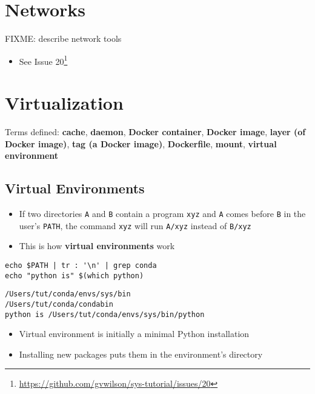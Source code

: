 \documentclass[krantzl]{krantz}
\newcommand{\glossref}[1]{\textbf{#1}}
\newcommand{\hreffoot}[2]{{#1}\footnote{\href{#2}{#2}}}
\begin{document}
\chapter{Networks}\label{network}




FIXME: describe network tools

\begin{itemize}
\item See \hreffoot{Issue 20}{https://github.com/gvwilson/sys-tutorial/issues/20}

\end{itemize}
\chapter{Virtualization}\label{virt}




Terms defined: 
\glossref{cache}, \glossref{daemon}, \glossref{Docker container}, \glossref{Docker image}, \glossref{layer (of Docker image)}, \glossref{tag (a Docker image)}, \glossref{Dockerfile}, \glossref{mount}, \glossref{virtual environment}


\section{Virtual Environments}
\begin{itemize}
\item If two directories \texttt{A} and \texttt{B} contain a program \texttt{xyz}
    and \texttt{A} comes before \texttt{B} in the user’s \texttt{PATH},
    the command \texttt{xyz} will run \texttt{A/xyz} instead of \texttt{B/xyz}

\item This is how \glossref{virtual environments} work

\end{itemize}
\begin{lstlisting}[frame=tblr]
echo $PATH | tr : '\n' | grep conda
echo "python is" $(which python)
\end{lstlisting}

\begin{lstlisting}[frame=tblr,backgroundcolor=\color{black!5}]
/Users/tut/conda/envs/sys/bin
/Users/tut/conda/condabin
python is /Users/tut/conda/envs/sys/bin/python
\end{lstlisting}

\begin{itemize}
\item Virtual environment is initially a minimal Python installation

\item Installing new packages puts them in the environment’s directory

\end{itemize}
\end{document}
